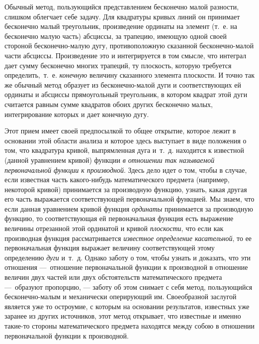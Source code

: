 {Обычный метод, пользующийся представлением бесконечно малой разности,
слишком облегчает себе задачу. Для квадратуры кривых линий он принимает
бесконечно малый треугольник, произведение ординаты на элемент (т.~е. на
бесконечно малую часть) абсциссы, за трапецию, имеющую одной своей стороной
бесконечно-малую дугу, противоположную сказанной бесконечно-малой части
абсциссы. Произведение это и интегрируется в том смысле, что интеграл дает
сумму бесконечно многих трапеций, ту плоскость, которую требуется
определить,~т.~е. {\em конечную} величину сказанного
элемента плоскости. И точно так же обычный метод образует из
бесконечно-малой дуги и соответствующих ей ординаты и абсциссы
прямоугольный треугольник, в котором квадрат этой дуги считается равным
сумме квадратов обоих других бесконечно малых, интегрирование которых и
дает конечную дугу.

Этот прием имеет своей предпосылкой то общее открытие, которое лежит в
основании этой области анализа и которое здесь выступает в виде положения о
том, что квадратура кривой, выпрямленная дуга и~т.~д. находится к известной
(данной уравнением кривой) функции {\em в отношении так
называемой первоначальной функции к производной}. Здесь дело идет о том,
чтобы в случае, если известная часть какого-нибудь математического предмета
(например, некоторой кривой) принимается за производную функцию, узнать,
какая другая его часть выражается соответствующей первоначальной функцией.
Мы знаем, что если данная уравнением кривой функция
{\em ординаты} принимается за производную функцию, то
соответствующая ей первоначальная функция есть выражение величины
отрезанной этой ординатой и кривой {\em плоскости}, что
если как производная функция рассматривается
{\em известное определение касательной}, то ее
первоначальная функция выражает величину соответствующей этому определению
{\em дуги} и~т.~д. Однако заботу о том, чтобы узнать и
доказать, что эти отношения —~отношение первоначальной функции к
производной в отношение величин двух частей или двух обстоятельств
математического предмета —~образуют пропорцию, — заботу об этом снимает с
себя метод, пользующийся бесконечно-малым и механически оперирующий им.
Своеобразной заслугой является уже то остроумие, с которым на основании
результатов, известных уже заранее из других источников, этот метод
открывает, что известные и именно такие-то стороны математического предмета
находятся между собою в отношении первоначальной функции к производной.

}
